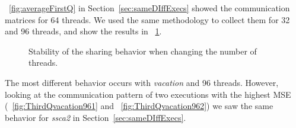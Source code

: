 \figurename~\ref{fig:averageFirstQ} in Section~\ref{sec:sameDIffExecs} showed the communication matrices for 64 threads. We used the same methodology to collect them for 32 and 96 threads, and show the results in \figurename~\ref{fig:averageThirdQ}.
%
\begin{figure}[!t]
	\centering
	\caption{Stability of the sharing behavior when changing the number of threads.}
	\label{fig:averageThirdQ}
\end{figure}
%
The most different behavior occurs with \emph{vacation} and 96 threads. However, looking at the communication pattern of two executions with the highest MSE (\figurename~\ref{fig:ThirdQvacation961} and \figurename~\ref{fig:ThirdQvacation962}) we saw the same behavior for \emph{ssca2} in Section~\ref{sec:sameDIffExecs}.
